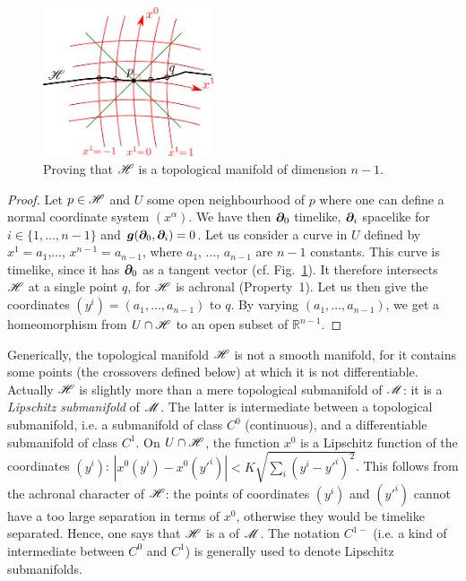 \begin{figure}
\centerline{\includegraphics[width=0.45\textwidth]{glo_hor_manifold.pdf}}
\caption[]{\label{f:glo:hor_manifold} \footnotesize
Proving that $\mathscr{H}$ is a topological manifold of dimension $n-1$.}
\end{figure}

\begin{proof}
Let $p\in\mathscr{H}$ and $U$ some open neighbourhood of $p$ where one can define
a normal coordinate system $(x^\alpha)$. We have then $\bm{\partial}_0$ timelike,
$\bm{\partial}_i$ spacelike for $i\in\{1,\ldots,n-1\}$ and $\bm{g}(\bm{\partial}_0, \bm{\partial}_i) = 0$.
Let us consider a curve in $U$ defined by $x^1 = a_1$,..., $x^{n-1} = a_{n-1}$,
where $a_1$, ..., $a_{n-1}$ are $n-1$ constants.
This curve is timelike, since it has $\bm{\partial}_0$ as a tangent vector
(cf. Fig.~\ref{f:glo:hor_manifold}).
It therefore intersects $\mathscr{H}$ at a single point $q$, for $\mathscr{H}$ is achronal (Property~1).
Let us then give the coordinates $(y^i) = (a_1,\ldots,a_{n-1})$ to $q$.
By varying $(a_1,\ldots,a_{n-1})$, we get a homeomorphism from $U\cap\mathscr{H}$
to an open subset of $\mathbb{R}^{n-1}$.
\end{proof}

\begin{remark}
Generically, the topological manifold $\mathscr{H}$ is not a smooth manifold, for it
contains some points (the crossovers defined below) at which it is not differentiable.
Actually $\mathscr{H}$ is slightly more than a mere topological submanifold of $\mathscr{M}$: it is a
\emph{Lipschitz submanifold} of $\mathscr{M}$. The latter is
intermediate between a topological submanifold, i.e.
a submanifold of class $C^0$ (continuous), and a differentiable submanifold of
class $C^1$. On $U\cap\mathscr{H}$, the function $x^0$ is a Lipschitz function
of the coordinates $(y^i)$: $\left|x^0(y^i) - x^0({y'}^i)\right| < K \sqrt{\sum_i (y^i - {y'}^i)^2}$.
This follows from the achronal character of $\mathscr{H}$: the points of coordinates
$(y^i)$ and $({y'}^i)$ cannot have a too large separation in terms of $x^0$,
otherwise they would be timelike separated.
Hence, one says that $\mathscr{H}$ is a  of $\mathscr{M}$. The notation $C^{1-}$ (i.e. a kind of intermediate between
$C^0$ and $C^1$) is generally used to denote Lipschitz submanifolds.
\end{remark}

